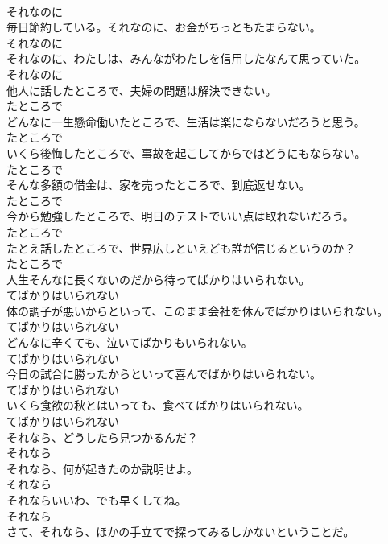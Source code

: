 \documentclass[8pt]{extreport}
\begin{document}
\begin{CJK}{UTF8}{min}
\\	それなのに
\\	毎日節約している。それなのに、お金がちっともたまらない。	
\\	それなのに
\\	それなのに、わたしは、みんながわたしを信用したなんて思っていた。	
\\	それなのに
\\	他人に話したところで、夫婦の問題は解決できない。	
\\	たところで
\\	どんなに一生懸命働いたところで、生活は楽にならないだろうと思う。	
\\	たところで
\\	いくら後悔したところで、事故を起こしてからではどうにもならない。	
\\	たところで
\\	そんな多額の借金は、家を売ったところで、到底返せない。	
\\	たところで
\\	今から勉強したところで、明日のテストでいい点は取れないだろう。	
\\	たところで
\\	たとえ話したところで、世界広しといえども誰が信じるというのか？	
\\	たところで
\\	人生そんなに長くないのだから待ってばかりはいられない。	
\\	てばかりはいられない
\\	体の調子が悪いからといって、このまま会社を休んでばかりはいられない。	
\\	てばかりはいられない
\\	どんなに辛くても、泣いてばかりもいられない。	
\\	てばかりはいられない
\\	今日の試合に勝ったからといって喜んでばかりはいられない。	
\\	てばかりはいられない
\\	いくら食欲の秋とはいっても、食べてばかりはいられない。	
\\	てばかりはいられない
\\	それなら、どうしたら見つかるんだ？	
\\	それなら
\\	それなら、何が起きたのか説明せよ。	
\\	それなら
\\	それならいいわ、でも早くしてね。	
\\	それなら
\\	さて、それなら、ほかの手立てで探ってみるしかないということだ。	

\end{CJK}
\end{document}
